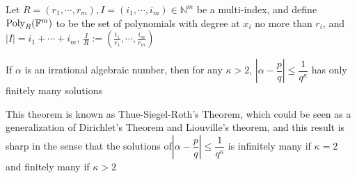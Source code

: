 \begin{definition}\label{definition 27}
Let $ R = (r_{1},\cdots,r_{m}), I = (i_{1},\cdots,i_{m}) \in \mathbb{N}^{m} $ be a multi-index, and define $\operatorname{Poly}_{R}(\mathbb{F}^{m}) $ to be the set of polynomials with degree at $ x_{i} $ no more than $ r_{i} $, and $ |I| = i_{1}+\cdots+i_{m} $, $ \frac{I}{R} := ( \frac{i_{1}}{r_{1}},\cdots,\frac{i_{m}}{r_{m}} ) $
\end{definition}

\begin{theorem}\label{theorem 28}
If $ \alpha $ is an irrational algebraic number, then for any $ \kappa > 2 $, $ \left| \alpha - \dfrac{p}{q} \right| \leq \dfrac{1}{q^{\kappa}} $ has only finitely many solutions
\end{theorem}

\begin{remark}
This theorem is known as Thue-Siegel-Roth's Theorem, which could be seen as a generalization of Dirichlet's Theorem and Liouville's theorem, and this result is sharp in the sense that the solutions of$ \left| \alpha - \dfrac{p}{q} \right| \leq \dfrac{1}{q^{\kappa}} $ is infinitely many if $ \kappa = 2 $ and 
finitely many if $ \kappa > 2 $
\end{remark}

